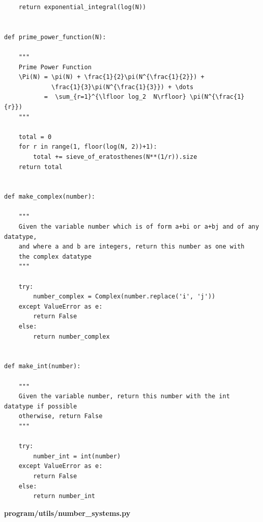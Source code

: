 \documentclass{article}
\begin{document}
\begin{lstlisting}
    return exponential_integral(log(N))


def prime_power_function(N):

    """
    Prime Power Function
    \Pi(N) = \pi(N) + \frac{1}{2}\pi(N^{\frac{1}{2}}) +
             \frac{1}{3}\pi(N^{\frac{1}{3}}) + \dots
           =  \sum_{r=1}^{\lfloor log_2  N\rfloor} \pi(N^{\frac{1}{r}})
    """

    total = 0
    for r in range(1, floor(log(N, 2))+1):
        total += sieve_of_eratosthenes(N**(1/r)).size
    return total


def make_complex(number):

    """
    Given the variable number which is of form a+bi or a+bj and of any datatype,
    and where a and b are integers, return this number as one with
    the complex datatype
    """

    try:
        number_complex = Complex(number.replace('i', 'j'))
    except ValueError as e:
        return False
    else:
        return number_complex


def make_int(number):

    """
    Given the variable number, return this number with the int datatype if possible
    otherwise, return False
    """

    try:
        number_int = int(number)
    except ValueError as e:
        return False
    else:
        return number_int
\end{lstlisting}

\textbf{program/utils/number\_systems.py}
\end{document}
